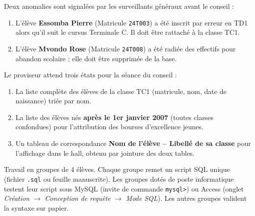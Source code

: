 \documentclass[11pt]{article}
\newcommand{\cle}[1]{{\popxbold\color{popdark}#1}}
\newcounter{popsec}
\newcounter{popsub}
\newcommand{\courssub}[1]{%
  \stepcounter{popsub}%
  \par\vspace{9pt}\noindent{\popxbold\fontsize{11.5}{13}\selectfont\color{popink}{\color{poporange}\thepopsec.\thepopsub}\hspace{6pt}#1}\par\nopagebreak\vspace{4pt}
}
\begin{document}
\medskip
Deux anomalies sont signalées par les surveillants généraux avant le conseil :
\begin{enumerate}
    \item L'élève \textbf{Essomba Pierre} (Matricule \texttt{24T003}) a été inscrit par erreur en \cle{TD1} alors qu'il suit le cursus \cle{Terminale C}. Il doit être rattaché à la classe \cle{TC1}.
    \item L'élève \textbf{Mvondo Rose} (Matricule \texttt{24T008}) a été radiée des effectifs pour abandon scolaire ; elle doit être supprimée de la base.
\end{enumerate}

Le proviseur attend trois états pour la séance du conseil :
\begin{enumerate}
    \item La liste complète des élèves de la classe \cle{TC1} (matricule, nom, date de naissance) triée par nom.
    \item La liste des élèves nés \textbf{après le 1er janvier 2007} (toutes classes confondues) pour l'attribution des bourses d'excellence jeunes.
    \item Un tableau de correspondance \textbf{Nom de l'élève -- Libellé de sa classe} pour l'affichage dans le hall, obtenu par jointure des deux tables.
\end{enumerate}

\courssub{Consignes}
Travail en groupes de 4 élèves. Chaque groupe remet un script \cle{SQL} unique (fichier \texttt{.sql} ou feuille manuscrite). Les groupes dotés de poste informatique testent leur script sous \cle{MySQL} (invite de commande \texttt{mysql>}) ou \cle{Access} (onglet \textit{Création} $\rightarrow$ \textit{Conception de requête} $\rightarrow$ \textit{Mode SQL}). Les autres groupes valident la syntaxe sur papier.
\end{document}
